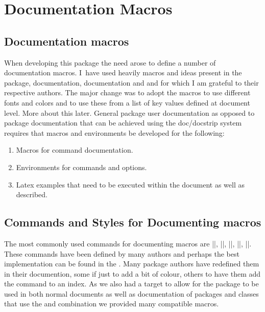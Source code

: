 \makeatletter

\thispagestyle{plain}


\chapter{Documentation Macros}


\section{Documentation macros}

When developing this package the need arose to define a number of documentation macros. I~have used heavily macros and ideas present in the  package,  documentation,  documentation  and  and for which I am grateful to their respective authors. The major change was to adopt the macros to use different fonts and colors and to use these from a list of key values defined at document level. More about this later. General package user documentation as opposed to package documentation that can be achieved using the doc/docstrip system requires that macros and environments be developed for the following:

\begin{enumerate}
\item Macros for command documentation.
\item Environments for commands and options.
\item Latex examples that need to be executed within the document as well as described.
\end{enumerate}


\section{Commands and Styles for Documenting macros}

The most commonly used commands for documenting macros are |\cs|, |\cmd|, |\meta|, |\marg|, |\oarg|. These commands have been defined by many authors and perhaps the best implementation can be found in the . Many package authors have redefined them in their documention, some if just to add a bit of colour, others to have them add the command to an index. As we also had a target to allow for
the package to be used in both normal documents as well as documentation
of packages and classes that use the  and  combination we provided many compatible macros.

